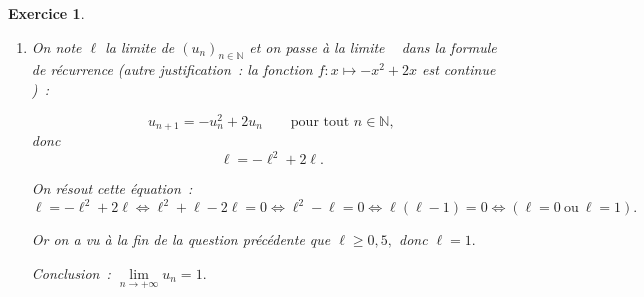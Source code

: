 \documentclass[10pt]{article}
\newtheorem{exo}{Exercice}
\begin{document}
\begin{exo}
\begin{enumerate}
Or d'après le théorème de limite monotone, toute suite croissante majorée converge, donc $(u_n)_{n\in\mathbb{N}}$ converge. De plus, $(u_n)_{n\in\mathbb{N}}$ étant croissante, sa limite $\ell$ est supérieure ou égale à $u_0~:$ \[\ell\geq 0,5.\]
\item On note $\ell$ la limite de $\left(u_n\right)_{n\in\mathbb{N}}$ et \og on passe à la limite \fg~{} dans la formule de récurrence (autre justification~: \og la fonction $f:x\mapsto -x^2+2x$ est continue \fg)~:

\[u_{n+1}=-u_n^2+2u_n\qquad\text{pour tout }n\in\mathbb{N},\] donc
\[\ell=-\ell^2+2\ell.\]

On résout cette équation~:
\[\ell=-\ell^2+2\ell \iff \ell^2+\ell-2\ell=0\iff \ell^2-\ell=0\iff\ell(\ell-1)=0\iff \left(\ell=0~\text{ou}~\ell=1\right).\]

Or on a vu à la fin de la question précédente que $\ell\geq 0,5, $ donc $\ell=1.$

Conclusion~: $\lim\limits_{n\to +\infty}u_n=1.$

\end{enumerate}

\end{exo}
 
\end{document}

